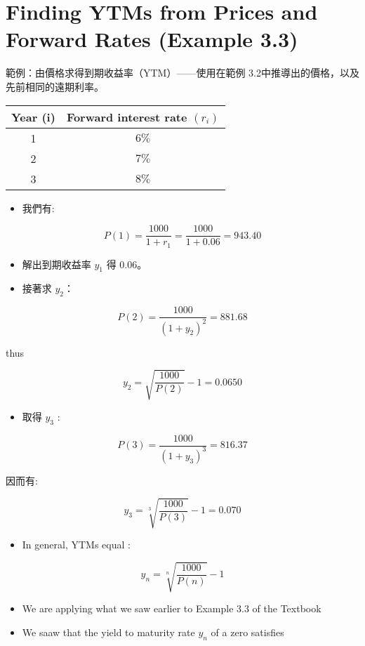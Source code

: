 \documentclass[letterpaper]{article}
\begin{document}
\section*{Finding YTMs from Prices and Forward Rates (Example 3.3)}
範例：由價格求得到期收益率（YTM）——使用在範例 3.2中推導出的價格，以及先前相同的遠期利率。


\begin{center}
\begin{tabular}{cc}
Year (i) & Forward interest rate $\left(r_{i}\right)$ \\
\hline
1 & $6 \%$ \\
2 & $7 \%$ \\
3 & $8 \%$ \\
\end{tabular}
\end{center}

\begin{itemize}
  \item 我們有:
\end{itemize}

$$
P(1)=\frac{1000}{1+r_{1}}=\frac{1000}{1+0.06}=943.40
$$

\begin{itemize}
	\item 解出到期收益率 \( y_{1} \) 得 \( 0.06 \)。
	\item 接著求 \( y_{2} \)： 
\end{itemize}

$$
P(2)=\frac{1000}{\left(1+y_{2}\right)^{2}}=881.68
$$

thus

$$
y_{2}=\sqrt{\frac{1000}{P(2)}}-1=0.0650
$$

\begin{itemize}
  \item 取得 $y_{3}$ :
\end{itemize}

$$
P(3)=\frac{1000}{\left(1+y_{3}\right)^{3}}=816.37
$$

因而有:

$$
y_{3}=\sqrt[3]{\frac{1000}{P(3)}}-1=0.070
$$

\begin{itemize}
  \item In general, YTMs equal :
\end{itemize}

$$
y_{n}=\sqrt[n]{\frac{1000}{P(n)}}-1
$$

\begin{itemize}
  \item We are applying what we saw earlier to Example 3.3 of the Textbook
  \item We saaw that the yield to maturity rate $y_{n}$ of a zero satisfies
\end{itemize}
\end{document}
